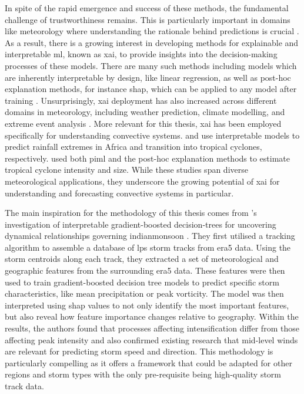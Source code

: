 In spite of the rapid emergence and success of these methods, the fundamental challenge of trustworthiness remains. This is particularly important in domains like meteorology where understanding the rationale behind predictions is crucial \citep{BarredoArrieta2019,Zhang2025}. As a result, there is a growing interest in developing methods for explainable and interpretable \acrshort{ml}, known as \acrfull{xai}, to provide insights into the decision-making processes of these models. There are many such methods including models which are inherently interpretable by design, like linear regression, as well as post-hoc explanation methods, for instance \acrfull{shap}, which can be applied to any model after training \citep{BarredoArrieta2019,Molnar2025}. Unsurprisingly, \acrshort{xai} deployment has also increased across different domains in meteorology, including weather prediction, climate modelling, and extreme event analysis \citep{Mamalakis2022,Yang2024}. More relevant for this thesis, \acrshort{xai} has been employed specifically for understanding convective systems. \cite{Bassine2025} and \cite{Zhang2019} use interpretable models to predict rainfall extremes in Africa and  transition into tropical cyclones, respectively. \cite{Zhuo2021} used both \acrshort{piml} and the post-hoc explanation methods to estimate tropical cyclone intensity and size. While these studies span diverse meteorological applications, they underscore the growing potential of \acrshort{xai} for understanding and forecasting convective systems in particular.

The main inspiration for the methodology of this thesis comes from \cite{Hunt2024}'s investigation of interpretable gradient-boosted decision-trees for uncovering dynamical relationships governing \gls{indianmonsoon} . They first utilised a tracking algorithm to assemble a database of \acrshort{lps} storm tracks from \acrshort{era5} data. Using the storm centroids along each track, they extracted a set of meteorological and geographic features from the surrounding \acrshort{era5} data. These features were then used to train gradient-boosted decision tree models to predict specific storm characteristics, like mean precipitation or peak vorticity. The model was then interpreted using \acrshort{shap} values to not only identify the most important features, but also reveal how feature importance changes relative to geography. Within the results, the authors found that processes affecting intensification differ from those affecting peak intensity and also confirmed existing research that mid-level winds are relevant for predicting storm speed and direction. This methodology is particularly compelling as it offers a framework that could be adapted for other regions and storm types with the only pre-requisite being high-quality storm track data.

